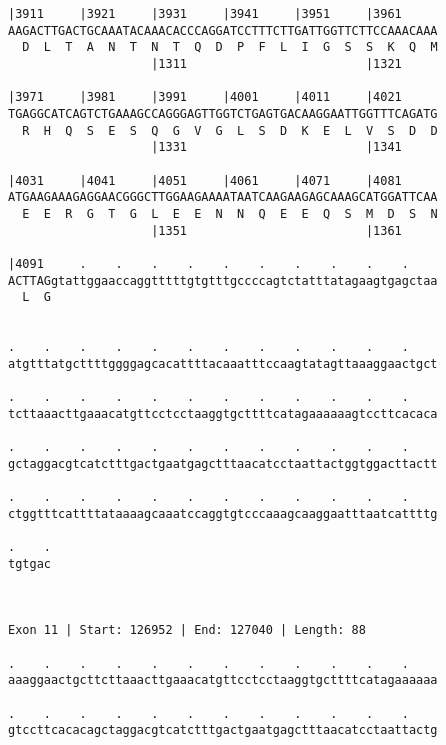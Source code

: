 \documentclass{article}
\begin{document}
\begin{Verbatim}
|3911     |3921     |3931     |3941     |3951     |3961     
AAGACTTGACTGCAAATACAAACACCCAGGATCCTTTCTTGATTGGTTCTTCCAAACAAA
  D  L  T  A  N  T  N  T  Q  D  P  F  L  I  G  S  S  K  Q  M
                    |1311                         |1321     
  
|3971     |3981     |3991     |4001     |4011     |4021     
TGAGGCATCAGTCTGAAAGCCAGGGAGTTGGTCTGAGTGACAAGGAATTGGTTTCAGATG
  R  H  Q  S  E  S  Q  G  V  G  L  S  D  K  E  L  V  S  D  D
                    |1331                         |1341     
  
|4031     |4041     |4051     |4061     |4071     |4081     
ATGAAGAAAGAGGAACGGGCTTGGAAGAAAATAATCAAGAAGAGCAAAGCATGGATTCAA
  E  E  R  G  T  G  L  E  E  N  N  Q  E  E  Q  S  M  D  S  N
                    |1351                         |1361     
  
|4091     .    .    .    .    .    .    .    .    .    .    
ACTTAGgtattggaaccaggtttttgtgtttgccccagtctatttatagaagtgagctaa
  L  G                                                      
                                                            
  
.    .    .    .    .    .    .    .    .    .    .    .    
atgtttatgcttttggggagcacattttacaaatttccaagtatagttaaaggaactgct
                                                            
.    .    .    .    .    .    .    .    .    .    .    .    
tcttaaacttgaaacatgttcctcctaaggtgcttttcatagaaaaaagtccttcacaca
                                                            
.    .    .    .    .    .    .    .    .    .    .    .    
gctaggacgtcatctttgactgaatgagctttaacatcctaattactggtggacttactt
                                                            
.    .    .    .    .    .    .    .    .    .    .    .    
ctggtttcattttataaaagcaaatccaggtgtcccaaagcaaggaatttaatcattttg
                                                            
.    .
tgtgac
      
      
 
Exon 11 | Start: 126952 | End: 127040 | Length: 88
 
.    .    .    .    .    .    .    .    .    .    .    .    
aaaggaactgcttcttaaacttgaaacatgttcctcctaaggtgcttttcatagaaaaaa
                                                            
.    .    .    .    .    .    .    .    .    .    .    .    
gtccttcacacagctaggacgtcatctttgactgaatgagctttaacatcctaattactg
                                                            

\end{Verbatim}
\end{document}
